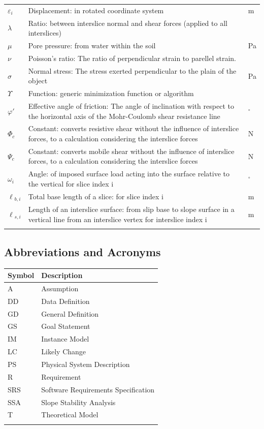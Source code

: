 \documentclass[12pt]{article}
\begin{document}
\begin{longtable*}{l l l}
\\
$\varepsilon{}_{i}$ & Displacement: in rotated coordinate system & m
\\
$\lambda{}$ & Ratio: between interslice normal and shear forces (applied to all interslices) & 
\\
$\mu{}$ & Pore pressure: from water within the soil & Pa
\\
$\nu{}$ & Poisson's ratio: The ratio of perpendicular strain to parellel strain. & 
\\
$\sigma{}$ & Normal stress: The stress exerted perpendicular to the plain of the object & Pa
\\
$\Upsilon{}$ & Function: generic minimization function or algorithm & 
\\
$\varphi{}'$ & Effective angle of friction: The angle of inclination with respect to the horizontal axis of the Mohr-Coulomb shear resistance line & ${}^{\circ}$
\\
$\Phi{}_{c}$ & Constant: converts resistive shear without the influence of interslice forces, to a calculation considering the interslice forces & N
\\
$\Psi{}_{c}$ & Constant: converts mobile shear without the influence of interslice forces, to a calculation considering the interslice forces & N
\\
$\omega{}_{i}$ & Angle: of imposed surface load acting into the surface relative to the vertical for slice index i & ${}^{\circ}$
\\
$\ell{}_{b,i}$ & Total base length of a slice: for slice index i & m
\\
$\ell{}_{s,i}$ & Length of an interslice surface: from slip base to slope surface in a vertical line from an interslice vertex for interslice index i & m
\\
\bottomrule
\label{Table:TablofSymb}
\end{longtable*}
\subsection{Abbreviations and Acronyms}
\label{Sec:AbbrandAcro}
\begin{longtable*}{l l}
\toprule
Symbol & Description
\\
\midrule
A & Assumption
\\
DD & Data Definition
\\
GD & General Definition
\\
GS & Goal Statement
\\
IM & Instance Model
\\
LC & Likely Change
\\
PS & Physical System Description
\\
R & Requirement
\\
SRS & Software Requirements Specification
\\
SSA & Slope Stability Analysis
\\
T & Theoretical Model
\\
\bottomrule
\label{Table:AbbrandAcro}
\end{longtable*}
\end{document}
